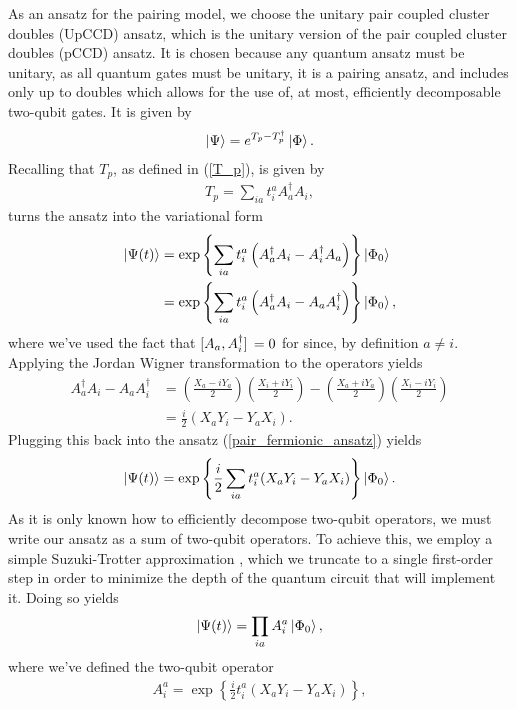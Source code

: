 \documentclass[Dual]{msu-thesis}
\begin{document}
As an ansatz for the pairing model, we choose the unitary pair coupled cluster doubles (UpCCD) ansatz, which is the unitary version of the pair coupled cluster doubles (pCCD) ansatz. It is chosen because any quantum ansatz must be unitary, as all quantum gates must be unitary, it is a pairing ansatz, and includes only up to doubles which allows for the use of, at most, efficiently decomposable two-qubit gates. It is given by
\begin{align}
\ket{\Psi}=e^{T_p-T^\dagger_p}\ket{\Phi}.
\end{align}
Recalling that $T_p$, as defined in (\ref{T_p}), is given by
\begin{align}
T_p=\sum_{ia}t^a_iA^\dagger_aA_i,
\end{align}
turns the ansatz into the variational form
\begin{align}
\label{pair_fermionic_ansatz}
\ket{\Psi(t)}
&=\exp\left\{\sum_{ia}t^a_i\left(A^\dagger_aA_i-A^\dagger_iA_a\right)\right\}\ket{\Phi_0}
\\
&=\exp\left\{\sum_{ia}t^a_i\left(A^\dagger_aA_i-A_aA^\dagger_i\right)\right\}\ket{\Phi_0},
\end{align}
where we've used the fact that $\comm*{A_a}{A^\dagger_i}=0$ for since, by definition $a\neq i$. Applying the Jordan Wigner transformation to the operators yields
\begin{align}
A_a^{\dagger}A_i-A_aA_i^{\dagger}
&=
\left(\frac{X_a-iY_a}{2}\right)\left(\frac{X_i+iY_i}{2}\right)
-
\left(\frac{X_a+iY_a}{2}\right)\left(\frac{X_i-iY_i}{2}\right)
\\
&=
\frac{i}{2}(X_aY_i-Y_aX_i).
\end{align}
Plugging this back into the ansatz (\ref{pair_fermionic_ansatz}) yields
\begin{align}
\label{pairing_pauli_ansatz}
\ket{\Psi(t)}
=
\exp\left\{\frac{i}{2}\sum_{ia}t^a_i(X_aY_i-Y_aX_i)\right\}\ket{\Phi_0}.
\end{align}
As it is only known how to efficiently decompose two-qubit operators, we must write our ansatz as a sum of two-qubit operators. To achieve this, we employ a simple Suzuki-Trotter approximation \cite{ref:trotter}, which we truncate to a single first-order step in order to minimize the depth of the quantum circuit that will implement it. Doing so yields
\begin{align}
\label{pairing_trott_ansatz}
\ket{{\Psi}(t)}
=
\prod_{ia}A^a_i\ket{\Phi_0},
\end{align}
where we've defined the two-qubit operator
\begin{align}
\label{aia}
A_i^a=\exp\left\{\frac{i}{2}t^a_i(X_aY_i-Y_aX_i)\right\}
,\end{align}
\end{document}
